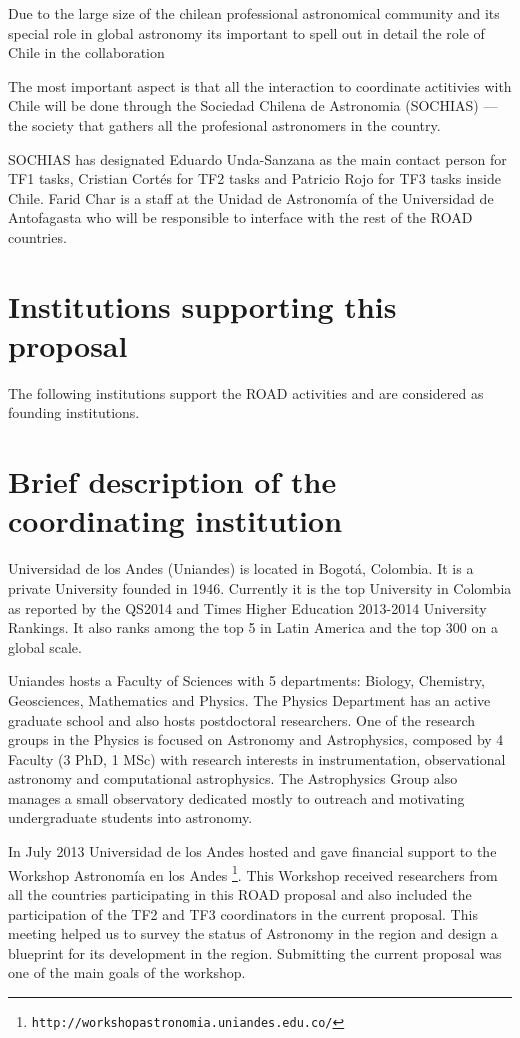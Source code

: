 \documentclass[12pt]{article}
\begin{document}
Due to the large size of the chilean professional astronomical
community and its special role in global astronomy its important to
spell out in detail the role of Chile in the collaboration

The most important aspect is that all the interaction to coordinate
actitivies with Chile will be done through the Sociedad Chilena de
Astronomia (SOCHIAS) --- the society that gathers all the profesional
astronomers in the country.

SOCHIAS has designated Eduardo Unda-Sanzana as the main contact
person for TF1 tasks, Cristian Cort\'es for TF2 tasks and Patricio
Rojo for TF3 tasks inside Chile. Farid Char is a staff at the Unidad
de Astronomía of the Universidad de Antofagasta who will be
responsible to interface with the rest of the ROAD countries.



\appendixpage
\appendix
\section{Institutions supporting this proposal}

The following institutions support the ROAD activities and are
considered as founding institutions.

\section{Brief description of the coordinating institution}

Universidad de los Andes (Uniandes) is located in Bogotá, Colombia. It
is a private University founded in 1946. Currently it is the top
University in Colombia as reported by the QS2014 and Times
Higher Education 2013-2014 University Rankings. It also ranks among
the top 5 in Latin America and the top 300 on a global scale.    

Uniandes hosts a Faculty of Sciences with 5 departments: Biology,
Chemistry, Geosciences, Mathematics and Physics. The Physics
Department has an active graduate school and also hosts postdoctoral
researchers. One of the research groups in the Physics is focused on
Astronomy and Astrophysics, composed by 4 Faculty (3 PhD, 1 MSc) with
research interests in instrumentation, observational astronomy and
computational astrophysics. The Astrophysics Group also manages a
small observatory dedicated mostly to outreach and motivating
undergraduate students into astronomy. 

In July 2013 Universidad de los Andes hosted and gave financial
support to the Workshop Astronomía en los
Andes \footnote{\texttt{http://workshopastronomia.uniandes.edu.co/}}. This
Workshop received researchers from all the countries participating in
this ROAD proposal and also included the participation of the TF2 and
TF3 coordinators in the current proposal. This meeting helped us to
survey the status of Astronomy in the region and design a blueprint
for its development in the region. Submitting the current proposal was
one of the main goals of the workshop. 
 
\end{document}
